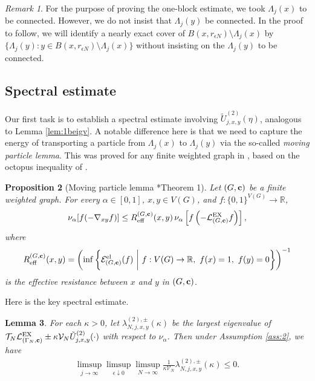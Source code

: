 \documentclass[11pt]{amsart}
\theoremstyle{plain}
\newtheorem{lemma}{Lemma}[section]
\newtheorem{proposition}[lemma]{Proposition}
\theoremstyle{definition}
\theoremstyle{remark}
\newtheorem{remark}[lemma]{Remark}
\begin{document}
\begin{remark}
For the purpose of proving the one-block estimate, we took $\Lambda_j(x)$ to be connected. However, we do not insist that $\Lambda_j(y)$ be connected. In the proof to follow, we will identify a nearly exact cover of $B(x, r_{\epsilon N}) \setminus \Lambda_j(x)$ by $\{\Lambda_j(y): y \in B(x,r_{\epsilon N})\setminus \Lambda_j(x)\}$ without insisting on the $\Lambda_j(y)$ to be connected.
\end{remark}

\subsection{Spectral estimate}

Our first task is to establish a spectral estimate involving ${\tilde{U}^{(2)}_{{{j}},{{x}},{{y}}}}(\eta)$, analogous to Lemma \ref{lem:1beigv}. A notable difference here is that we need to capture the energy of transporting a particle from $\Lambda_j(x)$ to $\Lambda_j(y)$ via the so-called \emph{moving particle lemma}. This was proved for any finite weighted graph in \cite{ChenMPL}, based on the octopus inequality of \cite{CLR09}.

\begin{proposition}[Moving particle lemma \cite{ChenMPL}*{Theorem 1}]
\label{prop:MPL}
Let $(G,{\bf c})$ be a finite weighted graph. For every $\alpha\in [0,1]$, $x,y \in V(G)$, and $f: \{0,1\}^{V(G)} \to\mathbb{R}$, 
\begin{align}
\label{ineq:dirichletex}
\nu_{\alpha}[f(-\nabla_{xy} f)] \leq R^{(G,{\bf c})}_{\rm eff}(x,y) \, \nu_\alpha \left[f\left(-\mathcal{L}^{\rm EX}_{(G,{\bf c})} f\right) \right],
\end{align}
where
\[
R^{(G,{\bf c})}_{\rm eff}(x,y) = \left(\inf\left\{\mathcal{E}^{\rm el}_{(G,{\bf c})}(f) ~\bigg|~ f:V(G)\to\mathbb{R},~ f(x)=1,~f(y)=0\right\}\right)^{-1}
\]
 is the effective resistance between $x$ and $y$ in $(G, {\bf c})$.
\end{proposition} 

Here is the key spectral estimate.

\begin{lemma}
\label{lem:2beigv}
For each $\kappa>0$, let $\lambda^{(2),\pm}_{N,j,x,y}(\kappa)$ be the largest eigenvalue of $\mathcal{T}_N \mathcal{L}^{\rm EX}_{(\Gamma_N,{\bf c})} \pm \kappa \mathcal{V}_N {\tilde{U}^{(2)}_{{{j}},{{x}},{{y}}}}(\cdot)$ with respect to $\nu_\alpha$. Then under Assumption \ref{ass:2}, we have
\begin{align}
\label{2beigv}
\limsup_{j\to\infty} \limsup_{\epsilon\downarrow 0} \limsup_{N\to\infty} \frac{1}{\kappa \mathcal{V}_N} \lambda^{(2),\pm}_{N,j,x,y}(\kappa) \leq 0.
\end{align}
\end{lemma}
\end{document}
